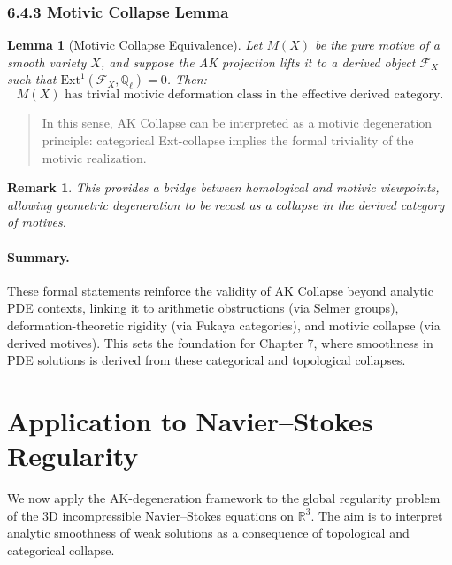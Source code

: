 \documentclass[11pt]{article}
\newtheorem{remark}[theorem]{Remark}
\newtheorem{lemma}[theorem]{Lemma}
\begin{document}
\subsubsection*{6.4.3 Motivic Collapse Lemma}

\begin{lemma}[Motivic Collapse Equivalence]
Let \( M(X) \) be the pure motive of a smooth variety \( X \), and suppose the AK projection lifts it to a derived object \( \mathcal{F}_X \) such that \( \mathrm{Ext}^1(\mathcal{F}_X, \mathbb{Q}_\ell) = 0 \). Then:
\[
M(X) \text{ has trivial motivic deformation class in the effective derived category.}
\]
\end{lemma}

\begin{quote}
In this sense, AK Collapse can be interpreted as a motivic degeneration principle:  
categorical Ext-collapse implies the formal triviality of the motivic realization.
\end{quote}

\begin{remark}
This provides a bridge between homological and motivic viewpoints, allowing geometric degeneration to be recast as a collapse in the derived category of motives.
\end{remark}

\paragraph{Summary.}
These formal statements reinforce the validity of AK Collapse beyond analytic PDE contexts, linking it to arithmetic obstructions (via Selmer groups), deformation-theoretic rigidity (via Fukaya categories), and motivic collapse (via derived motives). This sets the foundation for Chapter 7, where smoothness in PDE solutions is derived from these categorical and topological collapses.




\section{Application to Navier--Stokes Regularity}

We now apply the AK-degeneration framework to the global regularity problem of the 3D incompressible Navier--Stokes equations on $\mathbb{R}^3$. The aim is to interpret analytic smoothness of weak solutions as a consequence of topological and categorical collapse.
\end{document}
